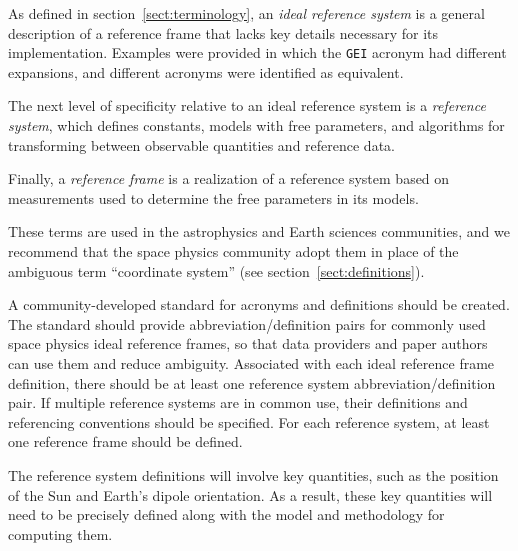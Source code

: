 \documentclass[draft]{agujournal2019}
\begin{document}
As defined in section~\ref {sect:terminology}, an {\it ideal reference system} is a general description of a reference frame that lacks key details necessary for its implementation. Examples were provided in which the \texttt{GEI} acronym had different expansions, and different acronyms were identified as equivalent.
  
The next level of specificity relative to an ideal reference system is a {\it reference system}, which defines constants, models with free parameters, and algorithms for transforming between observable quantities and reference data. 

Finally, a {\it reference frame} is a realization of a reference system based on measurements used to determine the free parameters in its models. 

These terms are used in the astrophysics and Earth sciences communities, and we recommend that the space physics community adopt them in place of the ambiguous term ``coordinate system'' (see section~\ref{sect:definitions}).

A community-developed standard for acronyms and definitions should be created. The standard should provide abbreviation/definition pairs for commonly used space physics ideal reference frames, so that data providers and paper authors can use them and reduce ambiguity. Associated with each ideal reference frame definition, there should be at least one reference system abbreviation/definition pair. If multiple reference systems are in common use, their definitions and referencing conventions should be specified. For each reference system, at least one reference frame should be defined.

The reference system definitions will involve key quantities, such as the position of the Sun and Earth's dipole orientation. As a result, these key quantities will need to be precisely defined along with the model and methodology for computing them. 

\end{document}
